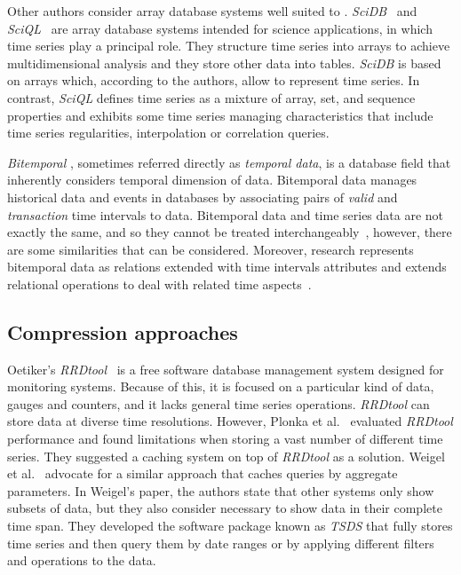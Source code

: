 Other authors consider array database systems well suited to
.  \emph{SciDB}~\cite{stonebraker09:scidb} and
\emph{SciQL}~\cite{zhang11} are array database systems intended for
science applications, in which time series play a principal role. They
structure time series into arrays to achieve multidimensional analysis
and they store other data into tables.  \emph{SciDB} is based on
arrays which, according to the authors, allow to represent time
series.  In contrast, \emph{SciQL} defines time series as a mixture of
array, set, and sequence properties and exhibits some time series
managing characteristics that include time series regularities,
interpolation or correlation queries.

\emph{Bitemporal} , sometimes referred directly as
\emph{temporal data}, is a database field that inherently considers
temporal dimension of data. Bitemporal data manages historical data
and events in databases by associating pairs of \emph{valid} and
\emph{transaction} time intervals to data.  Bitemporal data and time
series data are not exactly the same, and so they cannot be treated
interchangeably~\cite{schmidt95}, however, there are some similarities
that can be considered. Moreover,  research represents
bitemporal data as relations extended with time intervals attributes
and extends relational operations to deal with related time
aspects~\cite{jensen99:temporaldata,date02:_tempor_data_relat_model}.


\subsection{Compression approaches}

Oetiker's \emph{RRDtool}~\cite{rrdtool,lisa98:oetiker} is a free
software database management system designed for monitoring
systems. Because of this, it is focused on a particular kind of data,
gauges and counters, and it lacks general time series
operations. \emph{RRDtool} can store data at diverse time
resolutions. However, Plonka et al.~\cite{lisa07:plonka} evaluated
\emph{RRDtool} performance and found limitations when storing a vast
number of different time series. They suggested a caching system on
top of \emph{RRDtool} as a solution. Weigel et al.~\cite{weigel10}
advocate for a similar approach that caches queries by aggregate
parameters.  In Weigel's paper, the authors state that other systems
only show subsets of data, but they also consider necessary to show
data in their complete time span. They developed the software package
known as \emph{TSDS} that fully stores time series and then query them
by date ranges or by applying different filters and operations to the
data.

